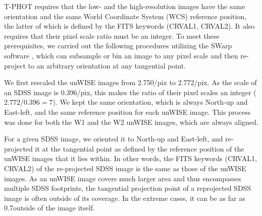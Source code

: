 \documentclass[apj,iop]{emulateapj}
\begin{document}

T-PHOT requires that the low- and the high-resolution images have the same orientation and the same World Coordinate System (WCS) reference position, the latter of which is defined by the FITS keywords (CRVAL1, CRVAL2). %
It also requires that their pixel scale ratio must be an integer. To meet these prerequisites, we carried out the following procedures utilizing the SWarp software \citep[][]{Bertin2002}, which can subsample or bin an image to any pixel scale and then re-project to an arbitrary orientation at any tangential point.

We first rescaled the unWISE images from 2.750\arcsec/pix to 2.772\arcsec/pix. As the scale of an SDSS image is 0.396\arcsec/pix, this makes the ratio of their pixel scales an integer ($2.772/0.396=7$). We kept the same orientation, which is always North-up and East-left, and the same reference position for each unWISE image. This process was done for both the W1 and the W2 unWISE images, which are always aligned.

For a given SDSS image, we oriented it to North-up and East-left, and re-projected it at the tangential point as defined by the reference position of the unWISE images that it lies within. In other words, the FITS keywords (CRVAL1, CRVAL2) of the re-projected SDSS image is the same as those of the unWISE images. As an unWISE image covers much larger area and thus encompasses multiple SDSS footprints, the tangential projection point of a reprojected SDSS image is often outside of its coverage. In the extreme cases, it can be as far as 0.7\degree outside of the image itself.
\end{document}

